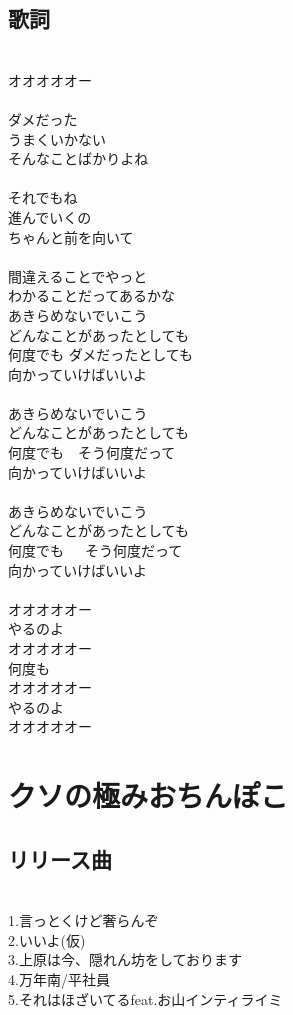 \subsection{歌詞}
\ \\ 
オオオオオー\\
\\
ダメだった\\
うまくいかない\\
そんなことばかりよね\\
\\
それでもね\\
進んでいくの\\
ちゃんと前を向いて\\
\\
間違えることでやっと\\
わかることだってあるかな\\
あきらめないでいこう\\
どんなことがあったとしても\\
何度でも ダメだったとしても\\
向かっていけばいいよ\\
\\
あきらめないでいこう\\
どんなことがあったとしても\\
何度でも　そう何度だって\\
向かっていけばいいよ\\
\\
あきらめないでいこう\\
どんなことがあったとしても\\
何度でも　\ そう何度だって\\
向かっていけばいいよ\\
 \\
オオオオオー\\
やるのよ\\
オオオオオー\\
何度も\\
オオオオオー\\
やるのよ\\
オオオオオー\\

\section{クソの極みおちんぽこ}
\subsection{リリース曲}
　\\
1.言っとくけど奢らんぞ\\
2.いいよ(仮)\\
3.上原は今、隠れん坊をしております\\
4.万年南/平社員\\
5.それはほざいてるfeat.お山インティライミ\\

